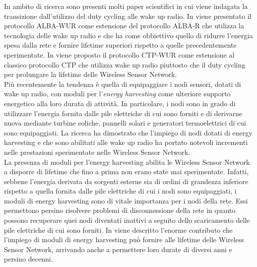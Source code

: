 \documentclass[binding=0.6cm,TFA]{sapthesis}
\begin{document}
In ambito di ricerca sono presenti molti paper scientifici in cui viene indagata la transizione dall'utilizzo del duty cycling alle wake up radio.
In \cite{beyond-duty-cycling-paper} viene presentato il protocollo ALBA-WUR come estensione del protocollo ALBA-R che utilizza la tecnologia delle wake up radio
e che ha come obbiettivo quello di ridurre l'energia spesa dalla rete e fornire lifetime superiori rispetto a quelle precedentemente sperimentate.
In \cite{ctp-wur-paper} viene proposto il protocollo CTP-WUR come estensione al classico protocollo CTP che utilizza wake up radio piuttosto che il duty cycling
per prolungare la lifetime delle Wireless Sensor Network.\\

Più recentemente la tendenza è quella di equipaggiare i nodi sensori, dotati di wake up radio, con moduli per l'\emph{energy harvesting} come ulteriore
supporto energetico alla loro durata di attività. In particolare, i nodi sono in grado di utilizzare l'energia fornita dalle pile elettriche di cui sono
forniti e di derivarne nuova mediante turbine eoliche, pannelli solari e generatori termoelettrici di cui sono equipaggiati. La ricerca ha dimostrato che
l'impiego di nodi dotati di energy harvesting \cite{energy-harvesting-paper} e che sono abilitati alle wake up radio \cite{wake-up-radios-paper} ha
portato notevoli incrementi nelle prestazioni sperimentate nelle Wireless Sensor Network.\\

La presenza di moduli per l'energy harvesting abilita le Wireless Sensor Network a disporre di lifetime che fino a prima non erano state mai sperimentate.
Infatti, sebbene l'energia derivata da sorgenti esterne sia di ordini di grandezza inferiore rispetto a quella fornita dalle pile elettriche di cui i nodi sono
equipaggiati, i moduli di energy harvesting sono di vitale importanza per i nodi della rete. Essi permettono persino risolvere problemi di disconnessione
della rete in quanto possono recuperare quei nodi diventati inattivi a seguito dello scaricamento delle pile elettriche di cui sono forniti. In
\cite{wsn-energy-harvesting-paper} viene descritto l'enorme contributo che l'impiego di moduli di energy harvesting può fornire alle lifetime delle
Wireless Sensor Network, arrivando anche a permettere loro durate di diversi anni e persino decenni.\\
\end{document}
